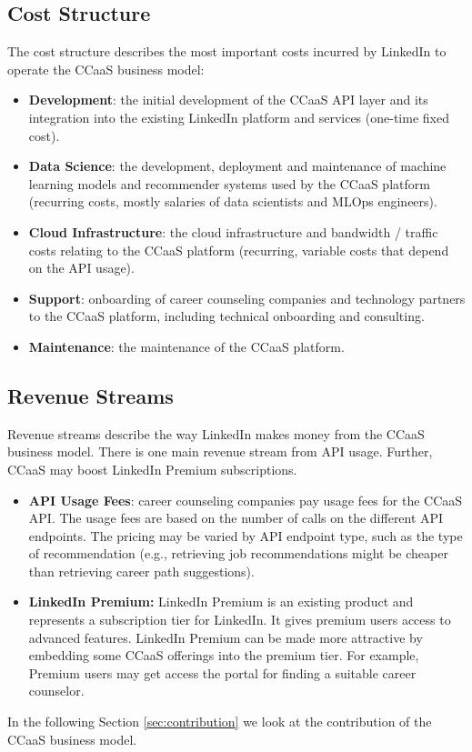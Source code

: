 \subsection{Cost Structure}

The cost structure describes the most important costs incurred by LinkedIn to operate the CCaaS business
model:

\begin{itemize}
    \item \textbf{Development}: the initial development of the CCaaS API layer and its integration into the
            existing LinkedIn platform and services (one-time fixed cost). 
    \item \textbf{Data Science}: the development, deployment and maintenance of machine learning
        models and recommender systems used by the CCaaS platform (recurring costs, mostly salaries 
        of data scientists and MLOps engineers).
    \item \textbf{Cloud Infrastructure}: the cloud infrastructure and bandwidth / traffic costs 
        relating to the CCaaS platform (recurring, variable costs that depend on the API usage).
    \item \textbf{Support}: onboarding of career counseling companies and technology partners
        to the CCaaS platform, including technical onboarding and consulting.
    \item \textbf{Maintenance}: the maintenance of the CCaaS platform.
\end{itemize}

\subsection{Revenue Streams}

Revenue streams describe the way LinkedIn makes money from the CCaaS business model. There is one main 
revenue stream from API usage. Further, CCaaS may boost LinkedIn Premium subscriptions.

\begin{itemize}
    \item \textbf{API Usage Fees}: career counseling companies pay usage fees for the CCaaS API.
        The usage fees are based on the number of calls on the different API endpoints. The pricing
        may be varied by API endpoint type, such as the type of recommendation (e.g., retrieving
        job recommendations might be cheaper than retrieving career path suggestions).
     \item \textbf{LinkedIn Premium:} LinkedIn Premium is an existing product and represents a subscription
        tier for LinkedIn. It gives premium users  access to advanced features. LinkedIn Premium can be made
        more attractive by embedding some CCaaS offerings into the premium tier. For example, Premium
        users may get access the portal for finding a suitable career counselor. 
\end{itemize}


\noindent In the following Section \ref{sec:contribution} we look at the contribution of the CCaaS business
model.
